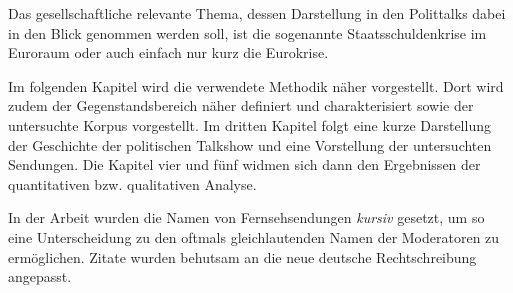 Das gesellschaftliche relevante Thema, dessen Darstellung in den Polittalks dabei in den Blick genommen werden soll, ist die sogenannte Staatsschuldenkrise im Euroraum oder auch einfach nur kurz die Eurokrise.

Im folgenden Kapitel wird die verwendete Methodik näher vorgestellt. Dort wird zudem der Gegenstandsbereich näher definiert und charakterisiert sowie der untersuchte Korpus vorgestellt. Im dritten Kapitel folgt eine kurze Darstellung der Geschichte der politischen Talkshow und eine Vorstellung der untersuchten Sendungen. Die Kapitel vier und fünf widmen sich dann den Ergebnissen der quantitativen bzw. qualitativen Analyse.

In der Arbeit wurden die Namen von Fernsehsendungen \textit{kursiv} gesetzt, um so eine Unterscheidung zu den oftmals gleichlautenden Namen der Moderatoren zu ermöglichen. Zitate wurden behutsam an die neue deutsche Rechtschreibung angepasst.